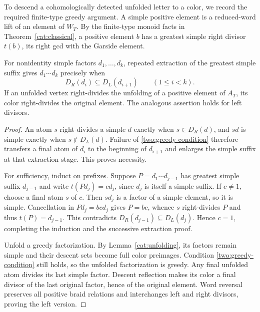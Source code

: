 To descend a cohomologically detected unfolded letter to a color,
we record the required finite-type greedy argument.  A simple positive
element is a reduced-word lift of an element of $W_T$.  By the
finite-type monoid facts in Theorem~\ref{cat:classical}, a
positive element $b$ has a greatest simple right divisor $t(b)$,
its right gcd with the Garside element.

\begin{lemma}
\label{two:greedy}
For nonidentity simple factors $d_1,\ldots,d_k$, repeated extraction
of the greatest simple suffix gives $d_1\cdots d_k$ precisely when
\begin{equation}
 D_R(d_i)\subseteq D_L(d_{i+1})\qquad(1\le i<k).
 \label{two:greedy-condition}
\end{equation}
If an unfolded vertex right-divides the unfolding of a positive
element of $A_T$, its color right-divides the original element.
The analogous assertion holds for left divisors.
\end{lemma}
\begin{proof}
An atom $s$ right-divides a simple $d$ exactly when $s\in D_R(d)$,
and $sd$ is simple exactly when $s\notin D_L(d)$.  Failure of
\eqref{two:greedy-condition} therefore transfers a final atom of
$d_i$ to the beginning of $d_{i+1}$ and enlarges the simple suffix
at that extraction stage.  This proves necessity.

For sufficiency, induct on prefixes.  Suppose
$P=d_1\cdots d_{j-1}$ has greatest simple suffix $d_{j-1}$ and
write $t(Pd_j)=cd_j$, since $d_j$ is itself a simple suffix.  If
$c\ne1$, choose a final atom $s$ of $c$.  Then $sd_j$ is a factor
of a simple element, so it is simple.  Cancellation in
$Pd_j=bcd_j$ gives $P=bc$, whence $s$ right-divides $P$ and thus
$t(P)=d_{j-1}$.  This contradicts
$D_R(d_{j-1})\subseteq D_L(d_j)$.  Hence $c=1$, completing the
induction and the successive extraction proof.

Unfold a greedy factorization.  By Lemma~\ref{cat:unfolding},
its factors remain simple and their descent sets become full color
preimages.  Condition \eqref{two:greedy-condition} still holds, so
the unfolded factorization is greedy.  Any final unfolded atom
divides its last simple factor.  Descent reflection makes its color
a final divisor of the last original factor, hence of the original
element.  Word reversal preserves all positive braid relations and
interchanges left and right divisors, proving the left version.
\end{proof}

